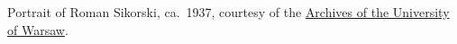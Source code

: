 Portrait of Roman Sikorski, ca.~1937, courtesy of the
\href{http://www.archiwum.uw.edu.pl/}{Archives of the University
of Warsaw}.
